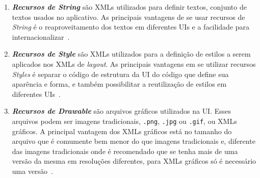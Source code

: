 \begin{enumerate}
  \item \textbf{\textit{Recursos de String}} são XMLs utilizados para definir textos, conjunto de textos usados no aplicativo. As principais vantagens de se usar recursos de \textit{String} é o reaproveitamento dos textos em diferentes \acs{UI}s e a facilidade para internacionalizar~\cite{AndroidStringResources}.

  \item \textbf{\textit{Recursos de Style}} são XMLs utilizados para a definição de estilos a serem aplicados nos XMLs de \textit{layout}. As principais vantagens em se utilizar recursos \textit{Styles} é separar o código de estrutura da \acs{UI} do código que define sua aparência e forma, e também possibilitar a reutilização de estilos em diferentes \acs{UI}s~\cite{AndroidStyleResources}.

  \item \textbf{\textit{Recursos de Drawable}} são arquivos gráficos utilizados na \acs{UI}. Esses arquivos podem ser imagens tradicionais, \texttt{.png}, \texttt{.jpg} ou \texttt{.gif}, ou XMLs gráficos. A principal vantagem dos XMLs gráficos está no tamanho do arquivo que é comumente bem menor do que imagens tradicionais e, diferente das imagens tradicionais onde é recomendado que se tenha mais de uma versão da mesma em resoluções diferentes, para XMLs gráficos só é necessário uma versão~\cite{AndroidDrawableResources}.
\end{enumerate}

